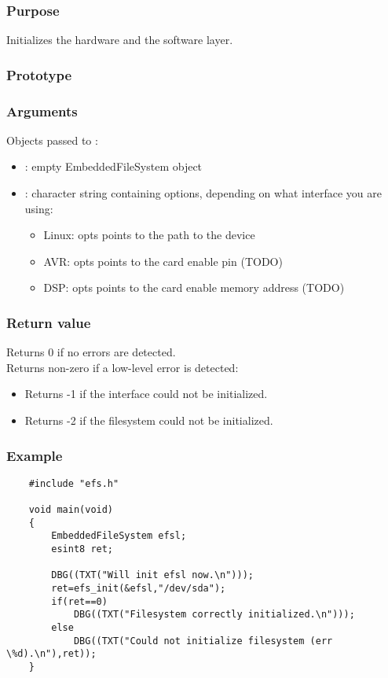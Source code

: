 \subsubsection*{Purpose}
Initializes the hardware and the software layer.
\subsubsection*{Prototype}
\subsubsection*{Arguments}
Objects passed to :
\begin{itemize}
	\item{: empty EmbeddedFileSystem object}
	\item
	{
		: character string containing options, depending on what
		interface you are using:
		\begin{itemize}
			\item{Linux: opts points to the path to the device}
			\item{AVR: opts points to the card enable pin (TODO)}
			\item{DSP: opts points to the card enable memory address (TODO)}
		\end{itemize}
	}
\end{itemize}
\subsubsection*{Return value}
Returns 0 if no errors are detected.\\
\newline
Returns non-zero if a low-level error is detected:
\begin{itemize}
	\item{Returns -1 if the interface could not be initialized.}
	\item{Returns -2 if the filesystem could not be initialized.}
\end{itemize}
\subsubsection*{Example}
\lstset{numbers=left, stepnumber=1, numberstyle=\small, numbersep=5pt, tabsize=4}
\begin{lstlisting}
	#include "efs.h"

	void main(void)
	{
		EmbeddedFileSystem efsl;
		esint8 ret;

		DBG((TXT("Will init efsl now.\n")));
		ret=efs_init(&efsl,"/dev/sda");
		if(ret==0)
			DBG((TXT("Filesystem correctly initialized.\n")));
		else
			DBG((TXT("Could not initialize filesystem (err \%d).\n"),ret));
	}
\end{lstlisting}
